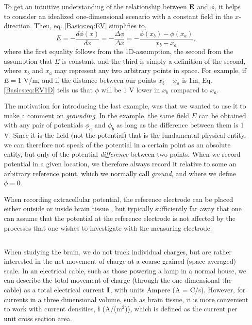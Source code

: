 To get an intuitive understanding of the relationship between ${\bf E}$ and $\phi$, it helps to consider an idealized one-dimensional scenario with a constant field in the $x$-direction. Then, eq. \ref{Basics:eq:EV} simplifies to,
\begin{equation}
E = -\frac{d\phi(x)}{dx} = -\frac{\Delta \phi}{\Delta x} = -\frac{\phi(x_b)-\phi(x_a)}{x_b-x_a},
\label{Basics:eq:EV1D}
\end{equation}
where the first equality follows from the 1D-assumption, the second from the assumption that $E$ is constant, and the third is simply a definition of the second, where $x_b$ and $x_a$ may represent any two arbitrary points in space. For example, if $E = 1$ V/m, and if the distance between our points $x_b-x_a$ is 1m, Eq. \ref{Basics:eq:EV1D} tells us that $\phi$ will be 1 V  lower in $x_b$ compared to $x_a$.

The motivation for introducing the last example, was that we wanted to use it to make a comment on \textit{grounding}. In the example, the same field $E$ can be obtained with any pair of potentials $\phi_a$ and $\phi_b$ as long as the difference between them is 1 V. Since it is the field (not the potential) that is the fundamental physical entity, we can therefore not speak of the potential in a certain point as an absolute entity, but only of the potential \textit{difference} between two points. When we record potential in a given location, we therefore always record it relative to some an arbitrary reference point, which we normally call \textit{ground}, and where we define $\phi = 0$. 

When recording extracellular potential, the reference electrode can be placed either outside or inside brain tissue \cite{Sharott2015}, but typically sufficiently far away that one can assume that the potential at the reference electrode is not affected by the processes that one wishes to investigate with the measuring electrode. 


\subsection{}
When studying the brain, we do not track individual charges, but are rather interested in the net movement of charge at a coarse-grained (space averaged) scale. In an electrical cable, such as those powering a lamp in a normal house, we can describe the total movement of charge (through the one-dimensional the cable) as a total electrical current ${\bf I}$, with units Ampere (A = C/s). However, for currents in a three dimensional volume, such as brain tissue, it is more convenient to work with current densities, ${\bf i}$ (A/(m$^2$)), which is defined as the current per unit cross section area. 

